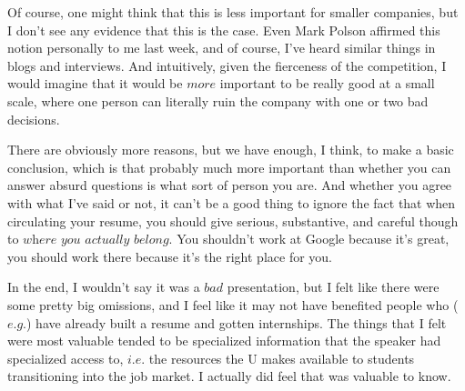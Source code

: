 \documentclass[a4paper]{article}
\begin{document}
Of course, one might think that this is less important for smaller companies, but I don't see any evidence that this is the case. Even Mark Polson affirmed this notion personally to me last week, and of course, I've heard similar things in blogs and interviews. And intuitively, given the fierceness of the competition, I would imagine that it would be $\textit{more}$ important to be really good at a small scale, where one person can literally ruin the company with one or two bad decisions.

There are obviously more reasons, but we have enough, I think, to make a basic conclusion, which is that probably much more important than whether you can answer absurd questions is what sort of person you are. And whether you agree with what I've said or not, it can't be a good thing to ignore the fact that when circulating your resume, you should give serious, substantive, and careful though to $\textit{where you actually belong}$. You shouldn't work at Google because it's great, you should work there because it's the right place for you.

In the end, I wouldn't say it was a $\textit{bad}$ presentation, but I felt like there were some pretty big omissions, and I feel like it may not have benefited people who ($\textit{e.g.}$) have already built a resume and gotten internships. The things that I felt were most valuable tended to be specialized information that the speaker had specialized access to, $\textit{i.e.}$ the resources the U makes available to students transitioning into the job market. I actually did feel that was valuable to know.
\end{document}
